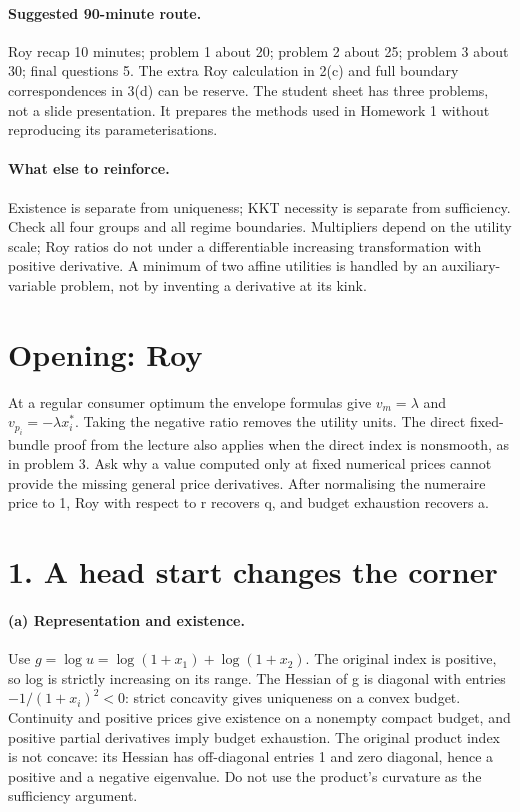 \documentclass[11pt,a4paper]{article}
\begin{document}
\paragraph{Suggested 90-minute route.} Roy recap 10 minutes; problem 1 about 20; problem 2 about 25; problem 3 about 30; final questions 5. The extra Roy calculation in 2(c) and full boundary correspondences in 3(d) can be reserve. The student sheet has three problems, not a slide presentation. It prepares the methods used in Homework 1 without reproducing its parameterisations.
\paragraph{What else to reinforce.} Existence is separate from uniqueness; KKT necessity is separate from sufficiency. Check all four groups and all regime boundaries. Multipliers depend on the utility scale; Roy ratios do not under a differentiable increasing transformation with positive derivative. A minimum of two affine utilities is handled by an auxiliary-variable problem, not by inventing a derivative at its kink.
\section*{Opening: Roy}
At a regular consumer optimum the envelope formulas give $v_m=\lambda$ and $v_{p_i}=-\lambda x_i^*$. Taking the negative ratio removes the utility units. The direct fixed-bundle proof from the lecture also applies when the direct index is nonsmooth, as in problem 3. Ask why a value computed only at fixed numerical prices cannot provide the missing general price derivatives. After normalising the numeraire price to 1, Roy with respect to r recovers q, and budget exhaustion recovers a.
\section*{1. A head start changes the corner}
\paragraph{(a) Representation and existence.}
Use $g=\log u=\log(1+x_1)+\log(1+x_2)$. The original index is positive, so log is strictly increasing on its range. The Hessian of g is diagonal with entries $-1/(1+x_i)^2<0$: strict concavity gives uniqueness on a convex budget. Continuity and positive prices give existence on a nonempty compact budget, and positive partial derivatives imply budget exhaustion. The original product index is not concave: its Hessian has off-diagonal entries 1 and zero diagonal, hence a positive and a negative eigenvalue. Do not use the product's curvature as the sufficiency argument.
\end{document}
